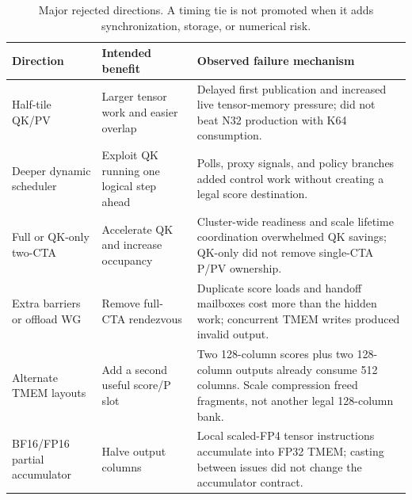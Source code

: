 \begin{table}[htbp]
\centering
\caption{Major rejected directions. A timing tie is not promoted when it
adds synchronization, storage, or numerical risk.}
\label{tab:rejections}
\begin{tabularx}{\textwidth}{p{}X X}
\toprule
Direction & Intended benefit & Observed failure mechanism \\
\midrule
Half-tile QK/PV & Larger tensor work and easier overlap & Delayed first
publication and increased live tensor-memory pressure; did not beat N32
production with K64 consumption. \\

Deeper dynamic scheduler & Exploit QK running one logical step ahead & Polls,
proxy signals, and policy branches added control work without creating a
legal score destination. \\

Full or QK-only two-CTA & Accelerate QK and increase occupancy & Cluster-wide
readiness and scale lifetime coordination overwhelmed QK savings; QK-only
did not remove single-CTA P/PV ownership. \\

Extra barriers or offload WG & Remove full-CTA rendezvous & Duplicate score
loads and handoff mailboxes cost more than the hidden work; concurrent TMEM
writes produced invalid output. \\

Alternate TMEM layouts & Add a second useful score/P slot & Two 128-column
scores plus two 128-column outputs already consume 512 columns. Scale
compression freed fragments, not another legal 128-column bank. \\

BF16/FP16 partial accumulator & Halve output columns & Local scaled-FP4 tensor
instructions accumulate into FP32 TMEM; casting between issues did not change
the accumulator contract. \\

\bottomrule
\end{tabularx}
\end{table}

